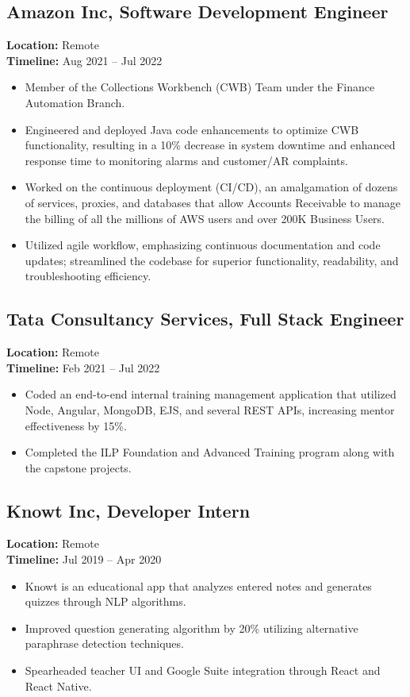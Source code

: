 \documentclass[a4paper,10pt]{article}
\begin{document}
\subsection*{Amazon Inc, Software Development Engineer}
\textbf{Location:} Remote \\
\textbf{Timeline:} Aug 2021 – Jul 2022
\begin{itemize}[leftmargin=0.15in]
    \item Member of the Collections Workbench (CWB) Team under the Finance Automation Branch.
    \item Engineered and deployed Java code enhancements to optimize CWB functionality, resulting in a 10\% decrease in system downtime and enhanced response time to monitoring alarms and customer/AR complaints.
    \item Worked on the continuous deployment (CI/CD), an amalgamation of dozens of services, proxies, and databases that allow Accounts Receivable to manage the billing of all the millions of AWS users and over 200K Business Users.
    \item Utilized agile workflow, emphasizing continuous documentation and code updates; streamlined the codebase for superior functionality, readability, and troubleshooting efficiency.
\end{itemize}

\subsection*{Tata Consultancy Services, Full Stack Engineer}
\textbf{Location:} Remote \\
\textbf{Timeline:} Feb 2021 – Jul 2022
\begin{itemize}[leftmargin=0.15in]
    \item Coded an end-to-end internal training management application that utilized Node, Angular, MongoDB, EJS, and several REST APIs, increasing mentor effectiveness by 15\%.
    \item Completed the ILP Foundation and Advanced Training program along with the capstone projects.
\end{itemize}

\subsection*{Knowt Inc, Developer Intern}
\textbf{Location:} Remote \\
\textbf{Timeline:} Jul 2019 – Apr 2020
\begin{itemize}[leftmargin=0.15in]
    \item Knowt is an educational app that analyzes entered notes and generates quizzes through NLP algorithms.
    \item Improved question generating algorithm by 20\% utilizing alternative paraphrase detection techniques.
    \item Spearheaded teacher UI and Google Suite integration through React and React Native.
\end{itemize}
\end{document}
